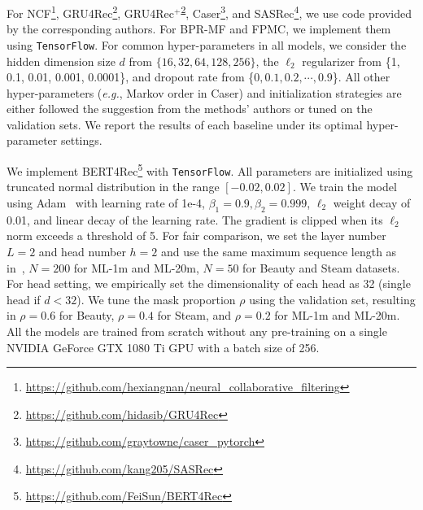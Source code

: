 For NCF\footnote{\url{https://github.com/hexiangnan/neural_collaborative_filtering}}, GRU4Rec\footnote{\label{gru4rec}\url{https://github.com/hidasib/GRU4Rec}}, GRU4Rec$^+$\textsuperscript{\ref{gru4rec}}, Caser\footnote{\url{https://github.com/graytowne/caser_pytorch}}, and SASRec\footnote{\url{https://github.com/kang205/SASRec}}, we use code provided by the corresponding authors.
For BPR-MF and FPMC, we implement them using \texttt{TensorFlow}.
For common hyper-parameters in all models, we consider the hidden dimension size $d$ from $\{16, 32, 64, 128, 256\}$, the $\ell_2$ regularizer from \{1, 0.1, 0.01, 0.001, 0.0001\}, and dropout rate from \{$0, 0.1, 0.2,\cdots, 0.9$\}.
All other hyper-parameters (\textit{e.g.}, Markov order in Caser) and initialization strategies are either followed the suggestion from the methods' authors or tuned on the validation sets.
We report the results of each baseline under its optimal hyper-parameter settings.

We implement BERT4Rec\footnote{\url{https://github.com/FeiSun/BERT4Rec}} with \texttt{TensorFlow}.
All parameters are initialized using truncated normal distribution in the range $[-0.02, 0.02]$.
We train the model using Adam~\cite{Kingma:iclr2015:Adam} with learning rate of 1e-4, $\beta_1 = 0.9, \beta_2 = 0.999$, $\ell_2$ weight decay of 0.01, and linear decay of the learning rate.
The gradient is clipped when its $\ell_2$ norm exceeds a threshold of 5. %
For fair comparison, we set the layer number $L=2$ and head number $h=2$ and use the same maximum sequence length as in~\cite{Kang:ICDM2018:SAS}, $N=200$ for ML-1m and ML-20m, $N=50$ for Beauty and Steam datasets. %
For head setting, we empirically set the dimensionality of each head as 32 (single head if $d<32$).
We tune the mask proportion $\rho$ using the validation set, resulting in $\rho=0.6$ for Beauty, $\rho=0.4$ for Steam, and $\rho=0.2$ for ML-1m and ML-20m. %
All the models are trained from scratch without any pre-training on a single NVIDIA GeForce GTX 1080 Ti GPU with a batch size of 256.

